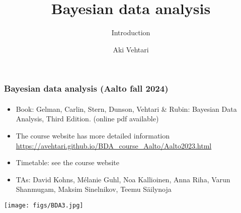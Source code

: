 \documentclass[english,t]{beamer}
\date{}
\title[]{Bayesian data analysis}
\subtitle{Introduction}
\author{Aki Vehtari}
\institute[Aalto University]{}
\begin{document}
\begin{frame}
  \frametitle{Bayesian data analysis (Aalto fall 2024)}  %
  \framesubtitle{}
  
  \begin{itemize}
  \item Book: Gelman, Carlin, Stern, Dunson, Vehtari \& Rubin: Bayesian Data
    Analysis, Third Edition. {\footnotesize (online pdf available)}
  \item The course website has more detailed information\\
    {\small\url{https://avehtari.github.io/BDA_course_Aalto/Aalto2023.html}}
  \item Timetable: see the course website
  \item TAs: David Kohns, Mélanie Guhl, Noa Kallioinen, Anna Riha, Varun Shanmugam, Maksim Sinelnikov, Teemu
    Säilynoja
    \end{itemize}
    \vspace{-0.25\baselineskip}
 \begin{center}
   \texttt{[image: figs/BDA3.jpg]}
 \end{center}

\end{frame}
\end{document}
